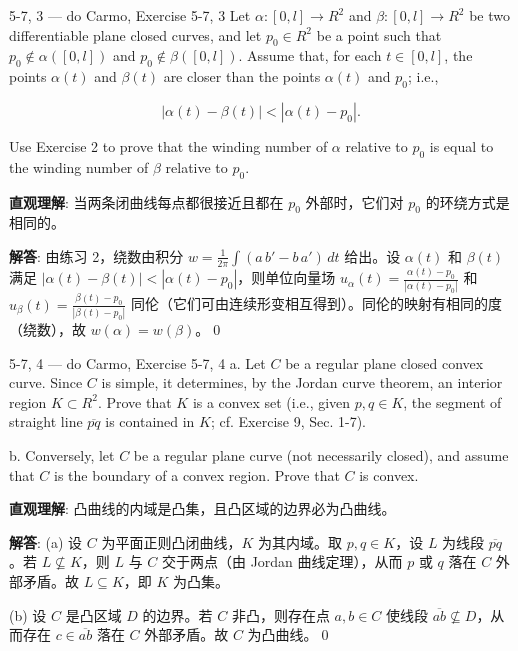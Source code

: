 \begin{exercise}{5-7, 3 — do Carmo, Exercise 5-7, 3}
Let $\alpha \colon [0,l] \to R^2$ and $\beta \colon [0,l] \to R^2$ be two differentiable plane closed curves, and let $p_0 \in R^2$ be a point such that $p_0 \notin \alpha([0,l])$ and $p_0 \notin \beta([0,l])$. Assume that, for each $t \in [0,l]$, the points $\alpha(t)$ and $\beta(t)$ are closer than the points $\alpha(t)$ and $p_0$; i.e.,

$$
| \alpha (t) - \beta (t) | < | \alpha (t) - p _ {0} |.
$$

Use Exercise 2 to prove that the winding number of $\alpha$ relative to $p_0$ is equal to the winding number of $\beta$ relative to $p_0$.
\end{exercise}
\begin{solution}
\textbf{直观理解}: 当两条闭曲线每点都很接近且都在 $p_0$ 外部时，它们对 $p_0$ 的环绕方式是相同的。

\textbf{解答}: 由练习 2，绕数由积分 $w=\frac{1}{2\pi}\int(a\,b'-b\,a')\,dt$ 给出。设 $\alpha(t)$ 和 $\beta(t)$ 满足 $|\alpha(t)-\beta(t)|<|\alpha(t)-p_0|$，则单位向量场 $u_\alpha(t)=\frac{\alpha(t)-p_0}{|\alpha(t)-p_0|}$ 和 $u_\beta(t)=\frac{\beta(t)-p_0}{|\beta(t)-p_0|}$ 同伦（它们可由连续形变相互得到）。同伦的映射有相同的度（绕数），故 $w(\alpha)=w(\beta)$。\qed
\end{solution}

\begin{exercise}{5-7, 4 — do Carmo, Exercise 5-7, 4}
a. Let $C$ be a regular plane closed convex curve. Since $C$ is simple, it determines, by the Jordan curve theorem, an interior region $K \subset R^2$. Prove that $K$ is a convex set (i.e., given $p, q \in K$, the segment of straight line $\overline{pq}$ is contained in $K$; cf. Exercise 9, Sec. 1-7).

b. Conversely, let $C$ be a regular plane curve (not necessarily closed), and assume that $C$ is the boundary of a convex region. Prove that $C$ is convex.
\end{exercise}
\begin{solution}
\textbf{直观理解}: 凸曲线的内域是凸集，且凸区域的边界必为凸曲线。

\textbf{解答}: (a) 设 $C$ 为平面正则凸闭曲线，$K$ 为其内域。取 $p,q\in K$，设 $L$ 为线段 $\overline{pq}$。若 $L\nsubseteq K$，则 $L$ 与 $C$ 交于两点（由 Jordan 曲线定理），从而 $p$ 或 $q$ 落在 $C$ 外部矛盾。故 $L\subseteq K$，即 $K$ 为凸集。

(b) 设 $C$ 是凸区域 $D$ 的边界。若 $C$ 非凸，则存在点 $a,b\in C$ 使线段 $\overline{ab}\nsubseteq D$，从而存在 $c\in\overline{ab}$ 落在 $C$ 外部矛盾。故 $C$ 为凸曲线。\qed
\end{solution}


